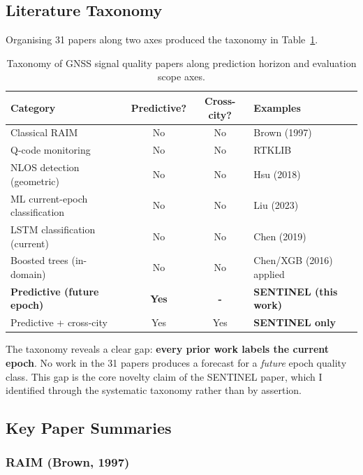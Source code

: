 \documentclass[12pt,a4paper]{article}
\begin{document}
\subsection{Literature Taxonomy}

Organising 31 papers along two axes produced the taxonomy in Table~\ref{tab:taxonomy}.

\begin{table}[H]
  \centering
  \caption{Taxonomy of GNSS signal quality papers along prediction horizon and
           evaluation scope axes.}
  \label{tab:taxonomy}
  \begin{tabular}{lccl}
    \toprule
    \textbf{Category} & \textbf{Predictive?} & \textbf{Cross-city?} & \textbf{Examples} \\
    \midrule
    Classical RAIM & No & No & Brown (1997) \cite{brown1997raim} \\
    Q-code monitoring & No & No & RTKLIB \cite{rtklib} \\
    NLOS detection (geometric) & No & No & Hsu (2018) \cite{hsu2018nlos} \\
    ML current-epoch classification & No & No & Liu (2023) \cite{liu2023gnss} \\
    LSTM classification (current) & No & No & Chen (2019) \cite{chen2019gps} \\
    Boosted trees (in-domain) & No & No & Chen/XGB (2016) applied \\
    \midrule
    \textbf{Predictive (future epoch)} & \textbf{Yes} & \textbf{ - } &
      \textbf{SENTINEL (this work)} \\
    Predictive + cross-city & Yes & Yes & \textbf{SENTINEL only} \\
    \bottomrule
  \end{tabular}
\end{table}

The taxonomy reveals a clear gap: \textbf{every prior work labels the current epoch}.
No work in the 31 papers produces a forecast for a \emph{future} epoch quality class.
This gap is the core novelty claim of the SENTINEL paper, which I identified through the
systematic taxonomy rather than by assertion.

\subsection{Key Paper Summaries}

\subsubsection{RAIM (Brown, 1997) \cite{brown1997raim}}
\end{document}
